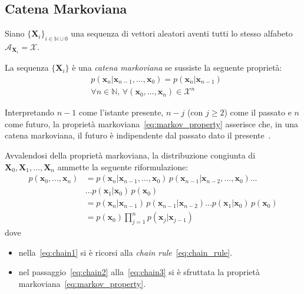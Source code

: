 \subsection{Catena Markoviana}\label{ssec:markov_chain}

Siano $\{\mathbf{X}_i\}_{i\in\mathbb{N}\cup0}$ una sequenza di vettori aleatori aventi tutti lo stesso alfabeto 
$\mathcal{A}_{\mathbf{X}_i}=\mathcal{X}$. 

\begin{Mybox}
\begin{definizione}\label{def:markov_property}La sequenza $\{\mathbf{X}_i\}$ è una \emph{catena markoviana} se sussiste la seguente proprietà:
    \begin{equation}
    \begin{split}
        &p(\mathbf{x}_n | \mathbf{x}_{n-1},\dots,\mathbf{x}_0)=
        p(\mathbf{x}_n | \mathbf{x}_{n-1}) \\
        & \forall n\in\mathbb{N},\, \forall (\mathbf{x}_0,\dots,\mathbf{x}_n)\in\mathcal{X}^n \label{eq:markov_property}
    \end{split}
    \end{equation}
\end{definizione}
\end{Mybox}

\begin{oss}[Interpretazione]
Interpretando $n-1$ come l'istante presente, $n-j$ (con $j\geq2$) come il passato e $n$ come futuro,
la proprietà markoviana~\eqref{eq:markov_property} asserisce che, in una catena markoviana, 
il futuro è indipendente dal passato dato il presente~\cite{conteFenomeniAleatori2006}.
\end{oss}
\bigskip
\begin{oss}
Avvalendosi della proprietà markoviana, la distribuzione congiunta di $\mathbf{X}_0,\mathbf{X}_1,\dots,\mathbf{X}_n$ ammette 
la seguente riformulazione:
\begin{align}
p(\mathbf{x}_0,\dots,\mathbf{x}_n) &= p(\mathbf{x}_n|\mathbf{x}_{n-1},\dots,\mathbf{x}_0)\,p(\mathbf{x}_{n-1}|\mathbf{x}_{n-2},\dots,\mathbf{x}_0)\dots \label{eq:chain1}\\
                                   &\dots
                                   p(\mathbf{x}_1|\mathbf{x}_0)\,p(\mathbf{x}_0) \label{eq:chain2}\\
                                   &=p(\mathbf{x}_n|\mathbf{x}_{n-1})\,p(\mathbf{x}_{n-1}|\mathbf{x}_{n-2})\dots p(\mathbf{x}_1|\mathbf{x}_0)\,p(\mathbf{x}_0)\label{eq:chain3} \\
                                   &=p(\mathbf{x}_0) \prod_{j=1}^n p(\mathbf{x}_j|\mathbf{x}_{j-1})
\end{align}
dove
\begin{itemize}
    \item nella~\eqref{eq:chain1} si è ricorsi alla \emph{chain rule}~\eqref{eq:chain_rule}.
    \item nel passaggio~\eqref{eq:chain2} alla~\eqref{eq:chain3} si è sfruttata la proprietà markoviana~\eqref{eq:markov_property}.
\end{itemize}
\end{oss}